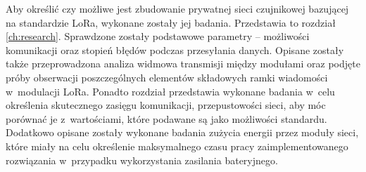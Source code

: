 Aby określić czy możliwe jest zbudowanie prywatnej sieci czujnikowej bazującej na standardzie LoRa, wykonane zostały jej
badania. Przedstawia to rozdział \ref{ch:research}. Sprawdzone zostały podstawowe parametry -- możliwości komunikacji
oraz stopień błędów podczas przesyłania danych. Opisane zostały także przeprowadzona analiza widmowa transmisji między
modułami oraz podjęte próby obserwacji poszczególnych elementów składowych ramki wiadomości w~modulacji LoRa. Ponadto
rozdział przedstawia wykonane badania w~celu określenia skutecznego zasięgu komunikacji, przepustowości sieci, aby móc
porównać je z~wartościami, które podawane są jako możliwości standardu. Dodatkowo opisane zostały wykonane badania
zużycia energii przez moduły sieci, które miały na celu określenie maksymalnego czasu pracy zaimplementowanego
rozwiązania w~przypadku wykorzystania zasilania bateryjnego.